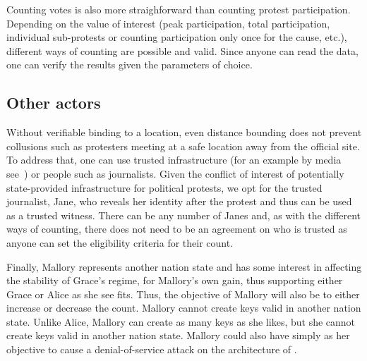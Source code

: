Counting votes is also more straighforward than counting protest
participation. Depending on the value of interest (peak participation,
total participation, individual sub-protests or counting participation
only once for the cause, etc.), different ways of counting are
possible and valid. Since anyone can read the data, one can verify the
results given the parameters of choice.

\subsection{Other actors}

Without verifiable binding to a location, even distance bounding does
not prevent collusions such as protesters meeting at a safe location
away from the official site. To address that, one can use trusted
infrastructure (for an example by media see~\cite{LeMondeProtestingSolution}) or people
such as journalists. Given the conflict of interest of potentially
state-provided infrastructure for political protests, we opt for the
trusted journalist, Jane, who reveals her identity after the protest
and thus can be used as a trusted witness. There can be any number of
Janes and, as with the different ways of counting, there does not need
to be an agreement on who is trusted as anyone can set the eligibility
criteria for their count.

Finally, Mallory represents another nation state and has some interest
in affecting the stability of Grace's regime, for Mallory's own gain,
thus supporting either Grace or Alice as she see fits.  Thus, the
objective of Mallory will also be to either increase or decrease the
count. Mallory cannot create keys valid in another nation
state. Unlike Alice, Mallory can create as many keys as she likes, but
she cannot create keys valid in another nation state. Mallory could
also have simply as her objective to cause a denial-of-service attack
on the architecture of \PRIVO.



